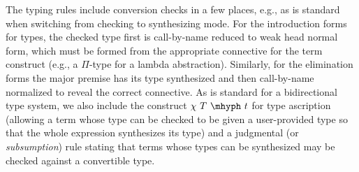 \documentclass{article}
\begin{document}
The typing rules include conversion checks in a few places, e.g., as is
standard when switching from checking to synthesizing mode.
For the introduction forms for types, the checked type first is call-by-name
reduced to weak head normal form, which must be formed from the appropriate connective
for the term construct (e.g., a \(\Pi\)-type for a lambda abstraction).
Similarly, for the elimination forms the major premise has its type synthesized
and then call-by-name normalized to reveal the correct connective.
As is standard for a bidirectional type system, we also include the construct
$\chi\ T\ \mhyph\ t$ for type ascription (allowing a term whose type can be
checked to be given a user-provided type so that the whole 
expression synthesizes its type) and a judgmental (or \emph{subsumption}) rule
stating that terms whose types can be synthesized may be checked against a
convertible type.
\end{document}
